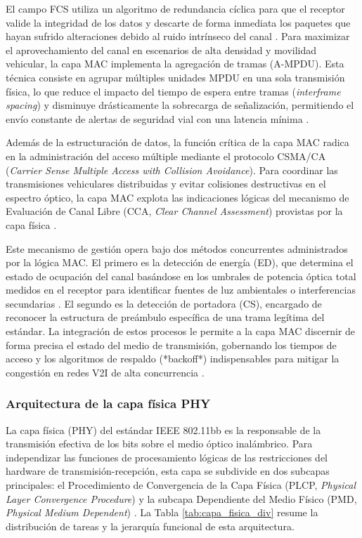 El campo FCS utiliza un algoritmo de redundancia cíclica para que el receptor valide la integridad de los datos y descarte de forma inmediata los paquetes que hayan sufrido alteraciones debido al ruido intrínseco del canal \cite{ieee80211bb2023}. Para maximizar el aprovechamiento del canal en escenarios de alta densidad y movilidad vehicular, la capa MAC implementa la agregación de tramas (A-MPDU). Esta técnica consiste en agrupar múltiples unidades MPDU en una sola transmisión física, lo que reduce el impacto del tiempo de espera entre tramas (\textit{interframe spacing}) y disminuye drásticamente la sobrecarga de señalización, permitiendo el envío constante de alertas de seguridad vial con una latencia mínima \cite{georlette2020visible}.



Además de la estructuración de datos, la función crítica de la capa MAC radica en la administración del acceso múltiple mediante el protocolo CSMA/CA (\textit{Carrier Sense Multiple Access with Collision Avoidance}). Para coordinar las transmisiones vehiculares distribuidas y evitar colisiones destructivas en el espectro óptico, la capa MAC explota las indicaciones lógicas del mecanismo de Evaluación de Canal Libre (CCA, \textit{Clear Channel Assessment}) provistas por la capa física \cite{solaija2023light}. 

Este mecanismo de gestión opera bajo dos métodos concurrentes administrados por la lógica MAC. El primero es la detección de energía (ED), que determina el estado de ocupación del canal basándose en los umbrales de potencia óptica total medidos en el receptor para identificar fuentes de luz ambientales o interferencias secundarias \cite{ieee80211bb2023}. El segundo es la detección de portadora (CS), encargado de reconocer la estructura de preámbulo específica de una trama legítima del estándar. La integración de estos procesos le permite a la capa MAC discernir de forma precisa el estado del medio de transmisión, gobernando los tiempos de acceso y los algoritmos de respaldo (*backoff*) indispensables para mitigar la congestión en redes V2I de alta concurrencia \cite{feukeu2023enhancing}.


\subsubsection{Arquitectura de la capa física PHY}
La capa física (PHY) del estándar IEEE 802.11bb es la responsable de la transmisión efectiva de los bits sobre el medio óptico inalámbrico. Para independizar las funciones de procesamiento lógicas de las restricciones del hardware de transmisión-recepción, esta capa se subdivide en dos subcapas principales: el Procedimiento de Convergencia de la Capa Física (PLCP, \textit{Physical Layer Convergence Procedure}) y la subcapa Dependiente del Medio Físico (PMD, \textit{Physical Medium Dependent}) \cite{ieee80211bb2023}. La Tabla \ref{tab:capa_fisica_div} resume la distribución de tareas y la jerarquía funcional de esta arquitectura.

